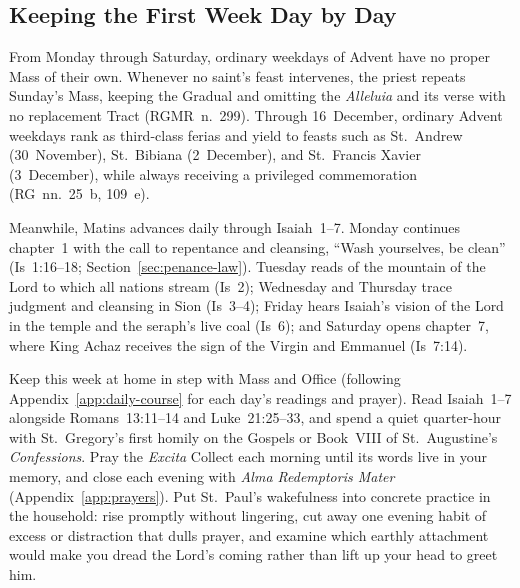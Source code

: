 \subsection{Keeping the First Week Day by Day}

From Monday through Saturday, ordinary weekdays of Advent have no proper
Mass of their own. Whenever no saint's feast intervenes, the priest
repeats Sunday's Mass, keeping the Gradual and omitting the
\textit{Alleluia} and its verse with no replacement Tract
(RGMR~n.~299). Through 16~December, ordinary Advent weekdays rank as
third-class ferias and yield to feasts such as St.~Andrew
(30~November), St.~Bibiana (2~December), and St.~Francis Xavier
(3~December), while always receiving a privileged commemoration
(RG~nn.~25~b, 109~e).

Meanwhile, Matins advances daily through Isaiah~1--7. Monday continues
chapter~1 with the call to repentance and cleansing, ``Wash yourselves, be
clean'' (Is~1:16--18; Section~\ref{sec:penance-law}). Tuesday reads of
the mountain of the Lord to which all nations stream (Is~2); Wednesday
and Thursday trace judgment and cleansing in Sion (Is~3--4); Friday hears
Isaiah's vision of the Lord in the temple and the seraph's live coal
(Is~6); and Saturday opens chapter~7, where King Achaz receives the sign
of the Virgin and Emmanuel (Is~7:14).

Keep this week at home in step with Mass and Office (following
Appendix~\ref{app:daily-course} for each day's readings and prayer).
Read Isaiah~1--7 alongside Romans~13:11--14 and Luke~21:25--33, and
spend a quiet quarter-hour with St.~Gregory's first homily on the
Gospels or Book~VIII of St.~Augustine's \textit{Confessions}. Pray the
\textit{Excita} Collect each morning until its words live in your
memory, and close each evening with \textit{Alma Redemptoris Mater}
(Appendix~\ref{app:prayers}). Put St.~Paul's wakefulness into concrete
practice in the household: rise promptly without lingering, cut away one
evening habit of excess or distraction that dulls prayer, and examine
which earthly attachment would make you dread the Lord's coming rather
than lift up your head to greet him.
